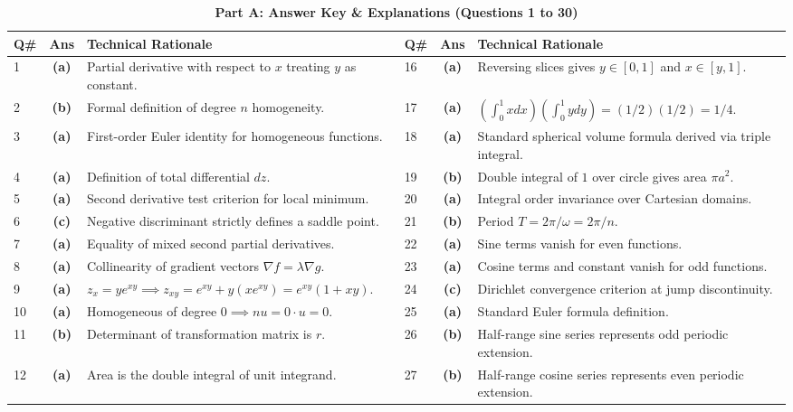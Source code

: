 \begin{table}[htbp]
\centering
\caption{\textbf{Part A: Answer Key \& Explanations (Questions 1 to 30)}}
\vspace{2mm}
\begin{tabularx}{\textwidth}{l c X l c X}
\toprule
\textbf{Q\#} & \textbf{Ans} & \textbf{Technical Rationale} & \textbf{Q\#} & \textbf{Ans} & \textbf{Technical Rationale} \\
\midrule
1 & \textbf{(a)} & Partial derivative with respect to $x$ treating $y$ as constant. & 16 & \textbf{(a)} & Reversing slices gives $y \in [0, 1]$ and $x \in [y, 1]$. \\
2 & \textbf{(b)} & Formal definition of degree $n$ homogeneity. & 17 & \textbf{(a)} & $(\int_0^1 x dx)(\int_0^1 y dy) = (1/2)(1/2) = 1/4$. \\
3 & \textbf{(a)} & First-order Euler identity for homogeneous functions. & 18 & \textbf{(a)} & Standard spherical volume formula derived via triple integral. \\
4 & \textbf{(a)} & Definition of total differential $dz$. & 19 & \textbf{(b)} & Double integral of $1$ over circle gives area $\pi a^2$. \\
5 & \textbf{(a)} & Second derivative test criterion for local minimum. & 20 & \textbf{(a)} & Integral order invariance over Cartesian domains. \\
6 & \textbf{(c)} & Negative discriminant strictly defines a saddle point. & 21 & \textbf{(b)} & Period $T = 2\pi / \omega = 2\pi/n$. \\
7 & \textbf{(a)} & Equality of mixed second partial derivatives. & 22 & \textbf{(a)} & Sine terms vanish for even functions. \\
8 & \textbf{(a)} & Collinearity of gradient vectors $\nabla f = \lambda \nabla g$. & 23 & \textbf{(a)} & Cosine terms and constant vanish for odd functions. \\
9 & \textbf{(a)} & $z_x = y e^{xy} \implies z_{xy} = e^{xy} + y(x e^{xy}) = e^{xy}(1+xy)$. & 24 & \textbf{(c)} & Dirichlet convergence criterion at jump discontinuity. \\
10 & \textbf{(a)} & Homogeneous of degree $0 \implies n u = 0 \cdot u = 0$. & 25 & \textbf{(a)} & Standard Euler formula definition. \\
11 & \textbf{(b)} & Determinant of transformation matrix is $r$. & 26 & \textbf{(b)} & Half-range sine series represents odd periodic extension. \\
12 & \textbf{(a)} & Area is the double integral of unit integrand. & 27 & \textbf{(b)} & Half-range cosine series represents even periodic extension. \\

\end{tabularx}
\end{table}
